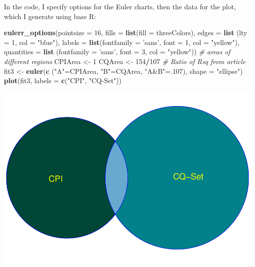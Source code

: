 \documentclass[
  openany]{book}
\newenvironment{Shaded}{\begin{snugshade}}{\end{snugshade}}
\newcommand{\CommentTok}[1]{\textcolor[rgb]{0.56,0.35,0.01}{\textit{#1}}}
\newcommand{\DataTypeTok}[1]{\textcolor[rgb]{0.13,0.29,0.53}{#1}}
\newcommand{\DecValTok}[1]{\textcolor[rgb]{0.00,0.00,0.81}{#1}}
\newcommand{\KeywordTok}[1]{\textcolor[rgb]{0.13,0.29,0.53}{\textbf{#1}}}
\newcommand{\NormalTok}[1]{#1}
\newcommand{\OperatorTok}[1]{\textcolor[rgb]{0.81,0.36,0.00}{\textbf{#1}}}
\newcommand{\StringTok}[1]{\textcolor[rgb]{0.31,0.60,0.02}{#1}}
\begin{document}
In the code, I specify options for the Euler charts, then the data for the plot, which I generate using base R:

\begin{Shaded}
\begin{Highlighting}[]
    \KeywordTok{eulerr_options}\NormalTok{(}\DataTypeTok{pointsize =} \DecValTok{16}\NormalTok{,}
                   \DataTypeTok{fills =} \KeywordTok{list}\NormalTok{(}\DataTypeTok{fill =}\NormalTok{ threeColors),}
                   \DataTypeTok{edges =} \KeywordTok{list}\NormalTok{ (}\DataTypeTok{lty =} \DecValTok{1}\NormalTok{, }\DataTypeTok{col =} \StringTok{"blue"}\NormalTok{),}
                   \DataTypeTok{labels =} \KeywordTok{list}\NormalTok{(}\DataTypeTok{fontfamily =} \StringTok{'sans'}\NormalTok{,}
                                 \DataTypeTok{font =} \DecValTok{1}\NormalTok{,}
                                 \DataTypeTok{col =} \StringTok{"yellow"}\NormalTok{),}
                   \DataTypeTok{quantities =} \KeywordTok{list}\NormalTok{ (}\DataTypeTok{fontfamily =} \StringTok{'sans'}\NormalTok{,}
                                      \DataTypeTok{font =} \DecValTok{3}\NormalTok{,}
                                      \DataTypeTok{col =} \StringTok{"yellow"}\NormalTok{))}
\CommentTok{# areas of different regions}
\NormalTok{    CPIArea <-}\StringTok{ }\DecValTok{1}
\NormalTok{    CQArea <-}\StringTok{ }\DecValTok{154}\OperatorTok{/}\DecValTok{107} \CommentTok{# Ratio of Rsq from article}
\NormalTok{    fit3 <-}\StringTok{ }\KeywordTok{euler}\NormalTok{(}\KeywordTok{c}\NormalTok{ (}\StringTok{"A"}\NormalTok{=CPIArea, }\StringTok{"B"}\NormalTok{=CQArea, }\StringTok{"A&B"}\NormalTok{=.}\DecValTok{107}\NormalTok{), }
                  \DataTypeTok{shape =} \StringTok{"ellipse"}\NormalTok{)}
    \KeywordTok{plot}\NormalTok{(fit3, }\DataTypeTok{labels =} \KeywordTok{c}\NormalTok{(}\StringTok{"CPI"}\NormalTok{, }\StringTok{"CQ-Set"}\NormalTok{))}
\end{Highlighting}
\end{Shaded}

\includegraphics{DataSciLibArts_files/figure-latex/unnamed-chunk-2-1.pdf}
\end{document}
